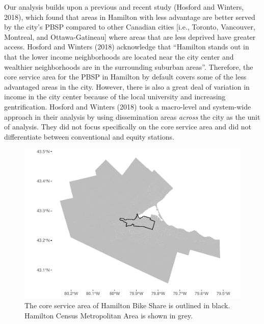 \documentclass[]{elsarticle} %
\begin{document}
Our analysis builds upon a previous and recent study (Hosford and
Winters, 2018), which found that areas in Hamilton with less advantage
are better served by the city's PBSP compared to other Canadian cities
{[}i.e., Toronto, Vancouver, Montreal, and Ottawa-Gatineau{]} where
areas that are less deprived have greater access. Hosford and Winters
(2018) acknowledge that ``Hamilton stands out in that the lower income
neighborhoods are located near the city center and wealthier
neighborhoods are in the surrounding suburban areas''. Therefore, the
core service area for the PBSP in Hamilton by default covers some of the
less advantaged areas in the city. However, there is also a great deal
of variation in income in the city center because of the local
university and increasing gentrification. Hosford and Winters (2018)
took a macro-level and system-wide approach in their analysis by using
dissemination areas \emph{across} the city as the unit of analysis. They
did not focus specifically on the core service area and did not
differentiate between conventional and equity stations.

\begin{figure}

{\centering \includegraphics[width=0.9\linewidth]{Bike-share-spatial-equity_files/figure-latex/hamilton-and-sobi-service-area-1} 

}

\caption{The core service area of Hamilton Bike Share is outlined in black. Hamilton Census Metropolitan Area is shown in grey.}\label{fig:hamilton-and-sobi-service-area}
\end{figure}
\end{document}
